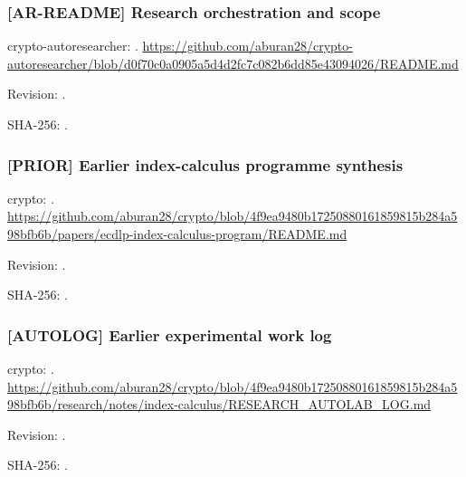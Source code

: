 \par\noindent\begin{minipage}{\linewidth}\small
\subsubsection*{[AR-README] Research orchestration and scope}\label{art:AR-README}
crypto-autoresearcher: .
\url{https://github.com/aburan28/crypto-autoresearcher/blob/d0f70c0a0905a5d4d2fc7c082b6dd85e43094026/README.md}
\par Revision: .
\par SHA-256: .
\end{minipage}\par\medskip

\par\noindent\begin{minipage}{\linewidth}\small
\subsubsection*{[PRIOR] Earlier index-calculus programme synthesis}\label{art:PRIOR}
crypto: .
\url{https://github.com/aburan28/crypto/blob/4f9ea9480b17250880161859815b284a598bfb6b/papers/ecdlp-index-calculus-program/README.md}
\par Revision: .
\par SHA-256: .
\end{minipage}\par\medskip

\par\noindent\begin{minipage}{\linewidth}\small
\subsubsection*{[AUTOLOG] Earlier experimental work log}\label{art:AUTOLOG}
crypto: .
\url{https://github.com/aburan28/crypto/blob/4f9ea9480b17250880161859815b284a598bfb6b/research/notes/index-calculus/RESEARCH_AUTOLAB_LOG.md}
\par Revision: .
\par SHA-256: .
\end{minipage}\par\medskip

